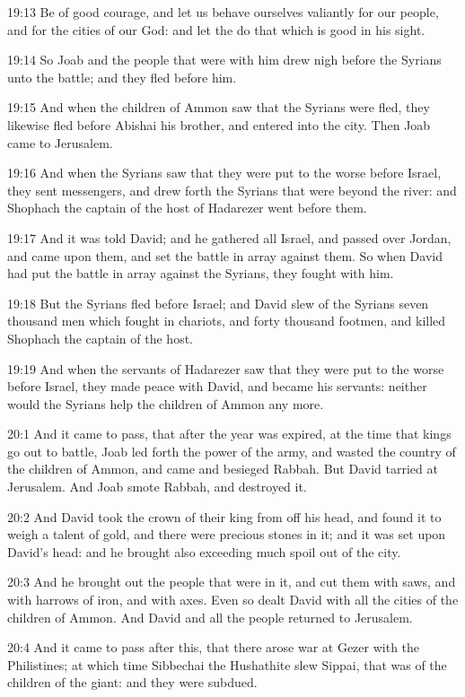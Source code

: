 19:13 Be of good courage, and let us behave ourselves valiantly for
our people, and for the cities of our God: and let the \LORD do that
which is good in his sight.

19:14 So Joab and the people that were with him drew nigh before the
Syrians unto the battle; and they fled before him.

19:15 And when the children of Ammon saw that the Syrians were fled,
they likewise fled before Abishai his brother, and entered into the
city. Then Joab came to Jerusalem.

19:16 And when the Syrians saw that they were put to the worse before
Israel, they sent messengers, and drew forth the Syrians that were
beyond the river: and Shophach the captain of the host of Hadarezer
went before them.

19:17 And it was told David; and he gathered all Israel, and passed
over Jordan, and came upon them, and set the battle in array against
them. So when David had put the battle in array against the Syrians,
they fought with him.

19:18 But the Syrians fled before Israel; and David slew of the
Syrians seven thousand men which fought in chariots, and forty
thousand footmen, and killed Shophach the captain of the host.

19:19 And when the servants of Hadarezer saw that they were put to the
worse before Israel, they made peace with David, and became his
servants: neither would the Syrians help the children of Ammon any
more.

20:1 And it came to pass, that after the year was expired, at the time
that kings go out to battle, Joab led forth the power of the army, and
wasted the country of the children of Ammon, and came and besieged
Rabbah. But David tarried at Jerusalem. And Joab smote Rabbah, and
destroyed it.

20:2 And David took the crown of their king from off his head, and
found it to weigh a talent of gold, and there were precious stones in
it; and it was set upon David's head: and he brought also exceeding
much spoil out of the city.

20:3 And he brought out the people that were in it, and cut them with
saws, and with harrows of iron, and with axes. Even so dealt David
with all the cities of the children of Ammon. And David and all the
people returned to Jerusalem.

20:4 And it came to pass after this, that there arose war at Gezer
with the Philistines; at which time Sibbechai the Hushathite slew
Sippai, that was of the children of the giant: and they were subdued.

